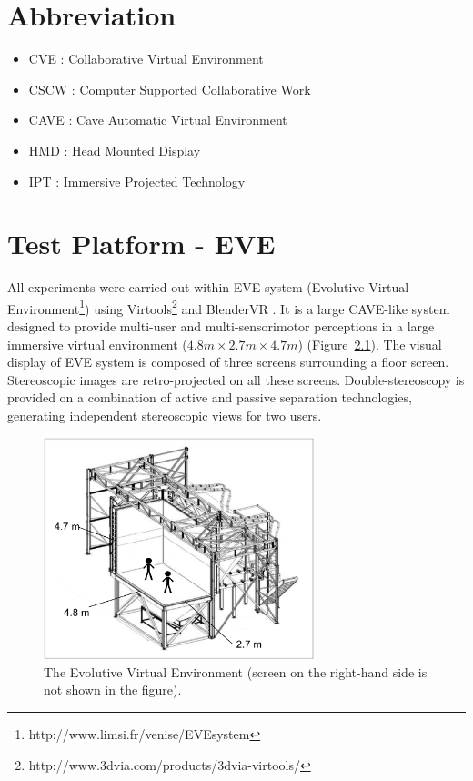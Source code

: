 \begin{appendices}
\appendixpage
\noappendicestocpagenum
\addappheadtotoc

\chapter{Abbreviation}
\label{appendix:abbreviation}
\begin{multicols}{2}
\begin{itemize}
	\item CVE : Collaborative Virtual Environment
	\item CSCW : Computer Supported Collaborative Work
	\item CAVE : Cave Automatic Virtual Environment
	\item HMD : Head Mounted Display
	\item IPT : Immersive Projected Technology
\end{itemize}
\end{multicols}

\chapter{Test Platform - EVE}
\label{appendix:platform}
All experiments were carried out within EVE system (Evolutive Virtual Environment\footnote{http://www.limsi.fr/venise/EVEsystem}) using Virtools\footnote{http://www.3dvia.com/products/3dvia-virtools/} and BlenderVR \citep{BlenderVR2015}. It is a large CAVE-like system designed to provide multi-user and multi-sensorimotor perceptions in a large immersive virtual environment ($4.8m\times2.7m\times4.7m$) (Figure~\ref{fig:EVE}). The visual display of EVE system is composed of three screens surrounding a floor screen. Stereoscopic images are retro-projected on all these screens. Double-stereoscopy is provided on a combination of active and passive separation technologies, generating independent stereoscopic views for two users.

\begin{figure}[tb]
  \centering
  \includegraphics[width=0.7\textwidth]{figures/app/EVE}
  \caption{\label{fig:EVE}The Evolutive Virtual Environment (screen on the right-hand side is not shown in the figure).}
\end{figure}


\end{appendices}
